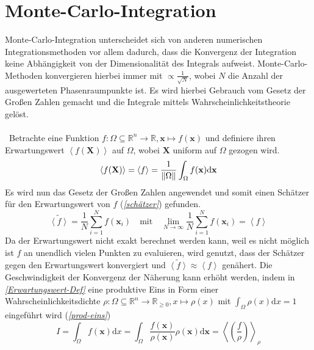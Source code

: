 \section{Monte-Carlo-Integration}
Monte-Carlo-Integration unterscheidet sich von anderen numerischen Integrationsmethoden vor allem dadurch, dass die Konvergenz der Integration keine Abhängigkeit von der Dimensionalität des Integrals aufweist. Monte-Carlo-Methoden konvergieren hierbei immer mit $\propto \frac{1}{\sqrt{N}} $, wobei $N$ die Anzahl der ausgewerteten Phasenraumpunkte ist. Es wird hierbei Gebrauch vom Gesetz der Großen Zahlen gemacht und die Integrale mittels Wahrscheinlichkeitstheorie gelöst. \\
\\\
Betrachte eine Funktion $f: \Omega \subseteq \mathbb{R}^n \rightarrow \mathbb{R}, \mathbf{x} \mapsto f(\mathbf{x})$ und definiere ihren Erwartungswert $\left\langle f(\mathbf{X})\right\rangle $ auf $\Omega$, wobei $\mathbf{X}$ uniform auf $\Omega$ gezogen wird.
\begin{equation}
\left\langle f(\mathbf{X})\right\rangle  = \left\langle f\right\rangle  = \frac{1}{\norm{\Omega}}\int_{\Omega} f(\mathbf{x}) \text{d}\mathbf{x}
\label{Erwartungswert-Def} 
\end{equation}
Es wird nun das Gesetz der Großen Zahlen angewendet und somit einen Schätzer für den Erwartungswert von $f$ (\textit{\autoref{schätzer}}) gefunden.
\begin{equation}
\tilde{\left\langle f \right\rangle } = \frac{1}{N} \sum_{i=1}^{N} f(\mathbf{x}_i) \quad \text{mit} \quad \lim_{N\rightarrow \infty} \frac{1}{N} \sum_{i=1}^{N} f(\mathbf{x}_i) = \left\langle f \right\rangle
\label{schätzer}
\end{equation}
Da der Erwartungswert nicht exakt berechnet werden kann, weil es nicht möglich ist $f$ an unendlich vielen Punkten zu evaluieren, wird genutzt, dass der Schätzer gegen den Erwartungswert konvergiert und $\tilde{\left\langle f \right\rangle } \approx \left\langle f \right\rangle$ genähert. Die Geschwindigkeit der Konvergenz der Näherung kann erhöht werden, indem in \textit{\autoref{Erwartungswert-Def}} eine produktive Eins in Form einer Wahrscheinlichkeitsdichte $\rho: \Omega \subseteq \mathbb{R}^n \to \mathbb{R}_{\geq 0}, x \mapsto \rho(x)$ mit $\int_{\Omega} \rho(x) \text{d}x = 1$ eingeführt wird (\textit{\autoref{prod-eins}})
\begin{equation}
I = \int_{\Omega} f(\mathbf{x}) \text{d}x =  \int_{\Omega} \frac{f(\mathbf{x})}{\rho(\mathbf{x})}\rho(\mathbf{x}) \text{d}\mathbf{x} = \left\langle \left(\frac{f}{\rho}\right) \right\rangle_{\rho}
\label{prod-eins} 
\end{equation}
